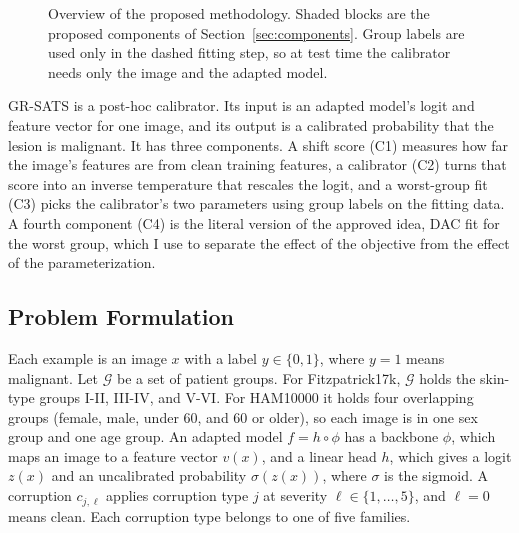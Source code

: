 \documentclass[sigconf,nonacm]{acmart}
\begin{document}
\begin{figure}[t]
  \caption{Overview of the proposed methodology. Shaded blocks are the proposed components of Section~\ref{sec:components}. Group labels are used only in the dashed fitting step, so at test time the calibrator needs only the image and the adapted model.}
  \label{fig:framework}
\end{figure}

GR-SATS is a post-hoc calibrator. Its input is an adapted model's logit and feature vector for one image, and its output is a calibrated probability that the lesion is malignant. It has three components. A shift score (C1) measures how far the image's features are from clean training features, a calibrator (C2) turns that score into an inverse temperature that rescales the logit, and a worst-group fit (C3) picks the calibrator's two parameters using group labels on the fitting data. A fourth component (C4) is the literal version of the approved idea, DAC fit for the worst group, which I use to separate the effect of the objective from the effect of the parameterization.

\subsection{Problem Formulation}
\label{sec:formulation}

Each example is an image $x$ with a label $y \in \{0,1\}$, where $y = 1$ means malignant. Let $\mathcal{G}$ be a set of patient groups. For Fitzpatrick17k, $\mathcal{G}$ holds the skin-type groups I-II, III-IV, and V-VI. For HAM10000 it holds four overlapping groups (female, male, under 60, and 60 or older), so each image is in one sex group and one age group. An adapted model $f = h \circ \phi$ has a backbone $\phi$, which maps an image to a feature vector $v(x)$, and a linear head $h$, which gives a logit $z(x)$ and an uncalibrated probability $\sigma(z(x))$, where $\sigma$ is the sigmoid. A corruption $c_{j,\ell}$ applies corruption type $j$ at severity $\ell \in \{1, \dots, 5\}$, and $\ell = 0$ means clean. Each corruption type belongs to one of five families.
\end{document}
